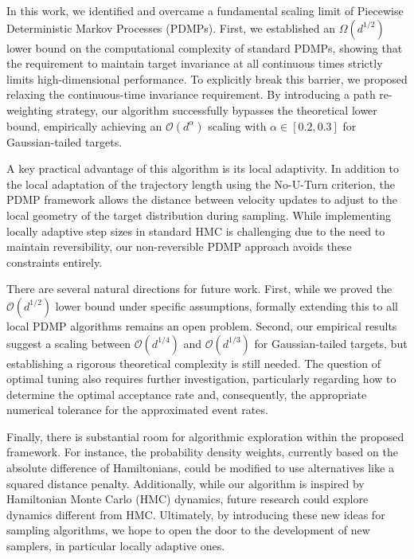 \documentclass{article}
\begin{document}
In this work, we identified and overcame a fundamental scaling limit of Piecewise Deterministic Markov Processes (PDMPs). First, we established an $\Omega(d^{1/2})$ lower bound on the computational complexity of standard PDMPs, showing that the requirement to maintain target invariance at all continuous times strictly limits high-dimensional performance. To explicitly break this barrier, we proposed relaxing the continuous-time invariance requirement. By introducing a path re-weighting strategy, our algorithm successfully bypasses the theoretical lower bound, empirically achieving an $\mathcal{O}(d^\alpha)$ scaling with $\alpha \in [0.2, 0.3]$ for Gaussian-tailed targets.

A key practical advantage of this algorithm is its local adaptivity. In addition to the local adaptation of the trajectory length using the No-U-Turn criterion, the PDMP framework allows the distance between velocity updates to adjust to the local geometry of the target distribution during sampling. While implementing locally adaptive step sizes in standard HMC is challenging due to the need to maintain reversibility, our non-reversible PDMP approach avoids these constraints entirely.

There are several natural directions for future work. First, while we proved the $\mathcal{O}(d^{1/2})$ lower bound under specific assumptions, formally extending this to all local PDMP algorithms remains an open problem. Second, our empirical results suggest a scaling between $\mathcal{O}(d^{1/4})$ and $\mathcal{O}(d^{1/3})$ for Gaussian-tailed targets, but establishing a rigorous theoretical complexity is still needed. The question of optimal tuning also requires further investigation, particularly regarding how to determine the optimal acceptance rate and, consequently, the appropriate numerical tolerance for the approximated event rates.


Finally, there is substantial room for algorithmic exploration within the proposed framework. For instance, the probability density weights, currently based on the absolute difference of Hamiltonians, could be modified to use alternatives like a squared distance penalty. 
Additionally, while our algorithm is inspired by Hamiltonian Monte Carlo (HMC) dynamics, future research could explore dynamics different from HMC.
Ultimately, by introducing these new ideas for sampling algorithms, we hope to open the door to the development of new samplers, in particular locally adaptive ones.
\end{document}
